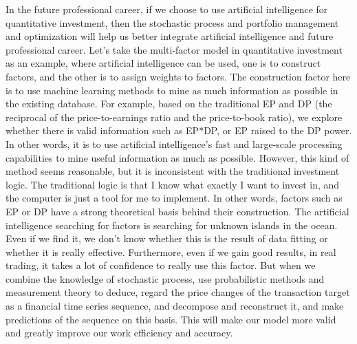 \documentclass{article}
\begin{document}
    In the future professional career, if we choose to use artificial intelligence for quantitative investment, then the stochastic process and portfolio management and optimization will help us better integrate artificial intelligence and future professional career. Let's take the multi-factor model in quantitative investment as an example, where artificial intelligence can be used, one is to construct factors, and the other is to assign weights to factors. The construction factor here is to use machine learning methods to mine as much information as possible in the existing database. For example, based on the traditional EP and DP (the reciprocal of the price-to-earnings ratio and the price-to-book ratio), we explore whether there is valid information such as EP*DP, or EP raised to the DP power. In other words, it is to use artificial intelligence's fast and large-scale processing capabilities to mine useful information as much as possible. However, this kind of method seems reasonable, but it is inconsistent with the traditional investment logic. The traditional logic is that I know what exactly I want to invest in, and the computer is just a tool for me to implement. In other words, factors such as EP or DP have a strong theoretical basis behind their construction. The artificial intelligence searching for factors is searching for unknown islands in the ocean. Even if we find it, we don't know whether this is the result of data fitting or whether it is really effective. Furthermore, even if we gain good results, in real trading, it takes a lot of confidence to really use this factor. But when we combine the knowledge of stochastic process, use probabilistic methods and measurement theory to deduce, regard the price changes of the transaction target as a financial time series sequence, and decompose and reconstruct it, and make predictions of the sequence on this basis. This will make our model more valid and greatly improve our work efficiency and accuracy.\\
    \\
\end{document}
